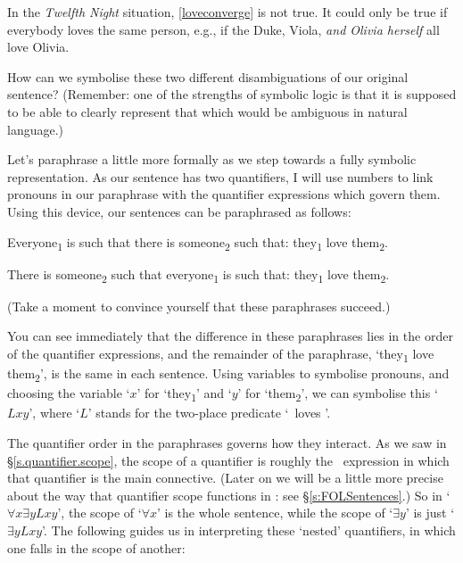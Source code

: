 In the \emph{Twelfth Night} situation, \ref{loveconverge} is not true. It could only be true if everybody loves the same person, e.g., if the Duke, Viola, \emph{and Olivia herself} all love Olivia. 


How can we symbolise these two different disambiguations of our original sentence? (Remember: one of the strengths of symbolic logic is that it is supposed to be able to clearly represent that which would be ambiguous in natural language.)

Let's paraphrase a little more formally as we step towards a fully symbolic representation. As our sentence has two quantifiers, I will use numbers to link pronouns in our paraphrase with the quantifier expressions which govern them. Using this device, our sentences can be paraphrased as follows: \begin{earg}
	\item[\ex{lovecycle1}] Everyone\textsubscript{1} is such that there is someone\textsubscript{2} such that: they\textsubscript{1} love them\textsubscript{2}. 
	\item[\ex{loveconverge1}] There is someone\textsubscript{2} such that everyone\textsubscript{1} is such that: they\textsubscript{1} love them\textsubscript{2}.
\end{earg} (Take a moment to convince yourself that these paraphrases succeed.)

You can see immediately that the difference in these paraphrases lies in the order of the quantifier expressions, and the remainder of the paraphrase, `they\textsubscript{1} love them\textsubscript{2}', is the same in each sentence. Using variables to symbolise pronouns, and choosing the variable `$x$' for `they\textsubscript{1}' and `$y$' for `them\textsubscript{2}', we can symbolise this `$Lxy$', where `$L$' stands for the two-place predicate `\ loves '. 

The quantifier order in the paraphrases governs how they interact. As we saw in §\ref{s.quantifier.scope}, the scope of a quantifier is roughly the \FOL\ expression in which that quantifier is the main connective. (Later on we will be a little more precise about the way that quantifier scope functions in \FOL: see §\ref{s:FOLSentences}.) So in `$\forall x \exists y Lxy$', the scope of `$\forall x$' is the whole sentence, while the scope of `$\exists y$' is just `$\exists y Lxy$'. The following guides us in interpreting these `nested' quantifiers, in which one falls in the scope of another:  

